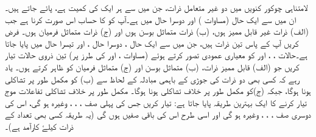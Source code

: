 لامتناہی چوکور کنویں میں دو غیر متعامل ذرات، جن میں سے ہر ایک کی کمیت  ہے، پائے جاتے ہیں۔ ان میں سے ایک حال  (مساوات ) اور دوسرا حال   میں ہے۔آپ کو  کا حساب اس صورت کرنا ہے جب (الف) ذرات غیر قابل ممیز ہوں، (ب) ذرات متماثل بوسن ہوں اور (ج) ذرات متماثل فرمیان ہوں۔
فرض کریں آپ کے پاس تین ذرات ہیں، جن میں سے ایک حال ، دوسرا حال ، اور تیسرا حال  میں پایا جاتا ہے۔حالات ، ، اور  کو معیاری عمودی تصور کرتے ہوئے (مساوات ،  اور  کی طرز پر) تین ذروی حالات تیار کریں جو (الف) قابل ممیز ذرات، (ب) متماثل بوسن اور (ج) متماثل فرمیان کو ظاہر کرتے ہوں۔ یاد رہے کہ کسی بھی دو ذرات کی جوڑی کے باہمی مبادلہ کے لحاظ سے (ب) کو مکمل طور پر تشاکلی ہونا ہوگا، جبکہ (ج)کو مکمل طور پر خلاف تشاکلی ہونا ہوگا۔  مکمل طور پر خلاف تشاکلی تفاعلات موج تیار کرنے کا ایک بہترین طریقہ پایا جاتا ہے:  تیار کریں جس کی پہلی صف ، ، ، وغیرہ ہو گی، اس کی دوسری صف ، ، ، وغیرہ ہو گی اور اسی طرح اس کی باقی صفیں ہوں گی (یہ طریقہ کسی بھی تعداد کے ذرات کیلۓ کارآمد ہے)۔

